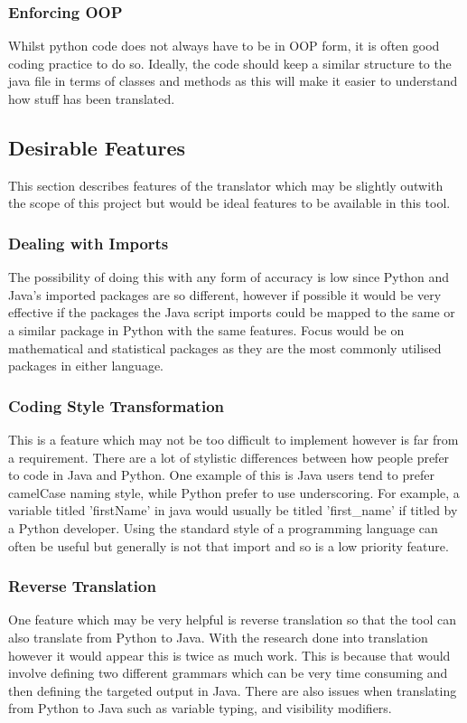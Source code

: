 \documentclass{l4proj}
\begin{document}
\subsubsection{Enforcing OOP}
Whilst python code does not always have to be in OOP form, it is often good coding practice to do so. Ideally, the code should keep a similar structure to the java file in terms of classes and methods as this will make it easier to understand how stuff has been translated.

\subsection{Desirable Features}
This section describes features of the translator which may be slightly outwith the scope of this project but would be ideal features to be available in this tool.
\subsubsection{Dealing with Imports}
The possibility of doing this with any form of accuracy is low since Python and Java's imported packages are so different, however if possible it would be very effective if the packages the Java script imports could be mapped to the same or a similar package in Python with the same features. Focus would be on mathematical and statistical packages as they are the most commonly utilised packages in either language.

\subsubsection{Coding Style Transformation}
This is a feature which may not be too difficult to implement however is far from a requirement. There are a lot of stylistic differences between how people prefer to code in Java and Python. One example of this is Java users tend to prefer camelCase naming style, while Python prefer to use underscoring. For example, a variable titled 'firstName' in java would usually be titled 'first\_name' if titled by a Python developer. Using the standard style of a programming language can often be useful but generally is not that import and so is a low priority feature.

\subsubsection{Reverse Translation}
One feature which may be very helpful is reverse translation so that the tool can also translate from Python to Java. With the research done into translation however it would appear this is twice as much work. This is because that would involve defining two different grammars which can be very time consuming and then defining the targeted output in Java. There are also issues when translating from Python to Java such as variable typing, and visibility modifiers.
\end{document}
